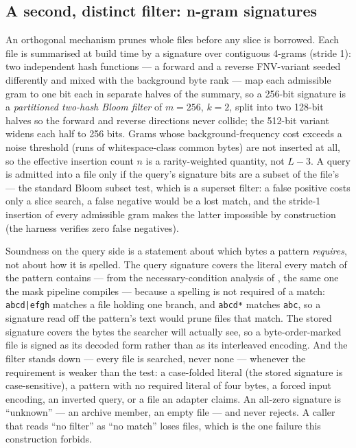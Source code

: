 \documentclass[11pt,letterpaper]{article}
\begin{document}
\subsection{A second, distinct filter: n-gram signatures}
\label{sec:ngram}
An orthogonal mechanism prunes whole files before any slice is borrowed. Each
file is summarised at build time by a signature over contiguous 4-grams
(stride 1): two independent hash functions --- a forward and a reverse
FNV-variant seeded differently and mixed with the background byte rank ---
map each admissible gram to one bit each in separate halves of the summary,
so a 256-bit signature is a \emph{partitioned two-hash Bloom filter}
\cite{bloom1970} of $m=256$, $k=2$, split into two 128-bit halves so the
forward and reverse directions never collide; the 512-bit variant widens
each half to 256 bits. Grams whose background-frequency cost exceeds a
noise threshold (runs of whitespace-class common bytes) are not inserted at
all, so the effective insertion count $n$ is a rarity-weighted quantity,
not $L-3$. A query is admitted into a file only if the query's signature
bits are a subset of the file's --- the standard Bloom subset test, which
is a superset filter: a false positive costs only a slice search, a false
negative would be a lost match, and the stride-1 insertion of every
admissible gram makes the latter impossible by construction (the harness
verifies zero false negatives).

Soundness on the query side is a statement about which bytes a pattern
\emph{requires}, not about how it is spelled. The query signature covers
the literal every match of the pattern contains --- from the
necessary-condition analysis of , the same one
the mask pipeline compiles --- because a spelling is not required of a
match: \texttt{abcd|efgh} matches a file holding one branch, and
\texttt{abcd*} matches \texttt{abc}, so a signature read off the pattern's
text would prune files that match. The stored signature covers the bytes
the searcher will actually see, so a byte-order-marked file is signed as
its decoded form rather than as its interleaved encoding. And the filter
stands down --- every file is searched, never none --- whenever the
requirement is weaker than the test: a case-folded literal (the stored
signature is case-sensitive), a pattern with no required literal of four
bytes, a forced input encoding, an inverted query, or a file an adapter
claims. An all-zero signature is ``unknown'' --- an archive member, an
empty file --- and never rejects. A caller that reads ``no filter'' as
``no match'' loses files, which is the one failure this construction
forbids.
\end{document}

